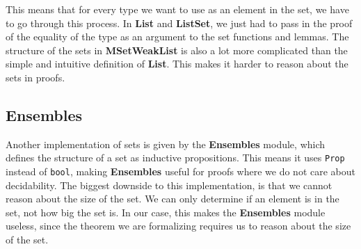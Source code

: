 This means that for every type we want to use as an element in the set, we have to go through this process.
In \textbf{List} and \textbf{ListSet}, we just had to pass in the proof of the equality of the type as an argument to the set functions and lemmas.
The structure of the sets in \textbf{MSetWeakList} is also a lot more complicated than the simple and intuitive definition of \textbf{List}.
This makes it harder to reason about the sets in proofs.

\subsection{Ensembles}

Another implementation of sets is given by the \textbf{Ensembles} module, which defines the structure of a set as inductive propositions.
This means it uses \lstinline{Prop} instead of \lstinline{bool},
making \textbf{Ensembles} useful for proofs where we do not care about decidability.
The biggest downside to this implementation, is that we cannot reason about the size of the set.
We can only determine if an element is in the set, not how big the set is.
In our case, this makes the \textbf{Ensembles} module useless, since the theorem we are formalizing requires us to reason about the
size of the set.




